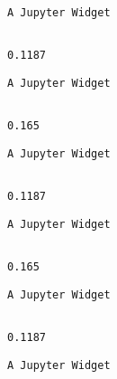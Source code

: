 \documentclass[11pt]{article}
\begin{document}
    
    \begin{verbatim}
A Jupyter Widget
    \end{verbatim}

    
    \begin{Verbatim}[commandchars=\\\{\}]

0.1187

    \end{Verbatim}

    
    \begin{verbatim}
A Jupyter Widget
    \end{verbatim}

    
    \begin{Verbatim}[commandchars=\\\{\}]

0.165

    \end{Verbatim}

    
    \begin{verbatim}
A Jupyter Widget
    \end{verbatim}

    
    \begin{Verbatim}[commandchars=\\\{\}]

0.1187

    \end{Verbatim}

    
    \begin{verbatim}
A Jupyter Widget
    \end{verbatim}

    
    \begin{Verbatim}[commandchars=\\\{\}]

0.165

    \end{Verbatim}

    
    \begin{verbatim}
A Jupyter Widget
    \end{verbatim}

    
    \begin{Verbatim}[commandchars=\\\{\}]

0.1187

    \end{Verbatim}

    
    \begin{verbatim}
A Jupyter Widget
    \end{verbatim}
\end{document}
